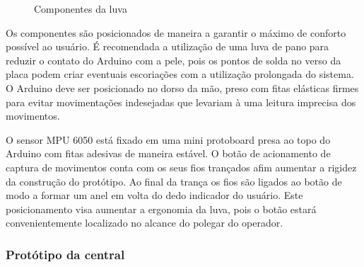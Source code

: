 \begin{figure}[ht]
    \centering
    \hfill
    \hfill
    \hfill
    \caption{Componentes da luva}
    \label{fig:luva}
\end{figure}

Os componentes são posicionados de maneira a garantir o máximo de conforto possível ao usuário. É recomendada a utilização de uma luva de pano para reduzir o contato do Arduino com a pele, pois os pontos de solda no verso da placa podem criar eventuais escoriações com a utilização prolongada do sistema. O Arduino deve ser posicionado no dorso da mão, preso com fitas elásticas firmes para evitar movimentações indesejadas que levariam à uma leitura imprecisa dos movimentos.

O sensor MPU 6050 está fixado em uma mini protoboard presa ao topo do Arduino com fitas adesivas de maneira estável. O botão de acionamento de captura de movimentos conta com os seus fios trançados afim aumentar a rigidez da construção do protótipo. Ao final da trança os fios são ligados ao botão de modo a formar um anel em volta do dedo indicador do usuário. Este posicionamento visa aumentar a ergonomia da luva, pois o botão estará convenientemente localizado no alcance do polegar do operador.

\subsubsection{Protótipo da central}

